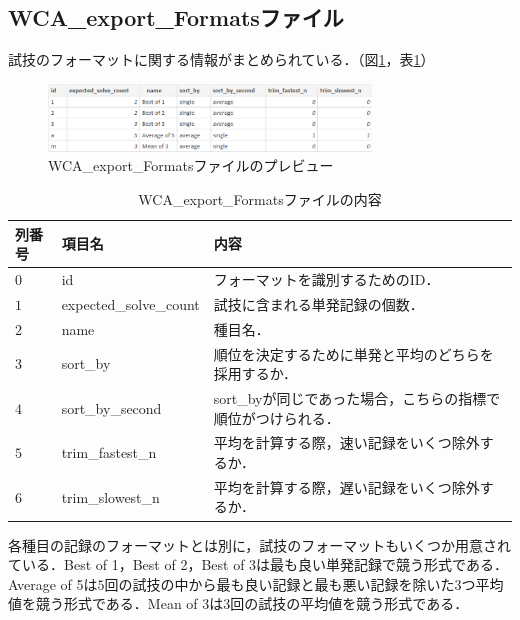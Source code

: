 \documentclass{article}
\begin{document}
  \subsection{WCA\_export\_Formatsファイル}

  試技のフォーマットに関する情報がまとめられている．（図\ref{figure:formats}，表\ref{table:formats}）\par

  \begin{figure}[h]
    \centering
    \includegraphics[height=18mm]{formats.png}
    \caption{WCA\_export\_Formatsファイルのプレビュー}
    \label{figure:formats}
  \end{figure}

  \begin{table}[h]
    \centering
    \caption{WCA\_export\_Formatsファイルの内容}
    \label{table:formats}
    \begin{tabular}{l|l|l}
      \hline
      列番号 & 項目名 & 内容 \\
      \hline \hline
      $ 0 $ & id & フォーマットを識別するためのID． \\
      $ 1 $ & expected\_solve\_count & 試技に含まれる単発記録の個数． \\
      $ 2 $ & name & 種目名． \\
      $ 3 $ & sort\_by & 順位を決定するために単発と平均のどちらを採用するか． \\
      $ 4 $ & sort\_by\_second & sort\_byが同じであった場合，こちらの指標で順位がつけられる． \\
      $ 5 $ & trim\_fastest\_n & 平均を計算する際，速い記録をいくつ除外するか． \\
      $ 6 $ & trim\_slowest\_n & 平均を計算する際，遅い記録をいくつ除外するか． \\
      \hline
    \end{tabular}
  \end{table}

  各種目の記録のフォーマットとは別に，試技のフォーマットもいくつか用意されている．Best of 1，Best of 2，Best of 3は最も良い単発記録で競う形式である．Average of 5は$ 5 $回の試技の中から最も良い記録と最も悪い記録を除いた$ 3 $つ平均値を競う形式である．Mean of 3は$ 3 $回の試技の平均値を競う形式である．\par
\end{document}
